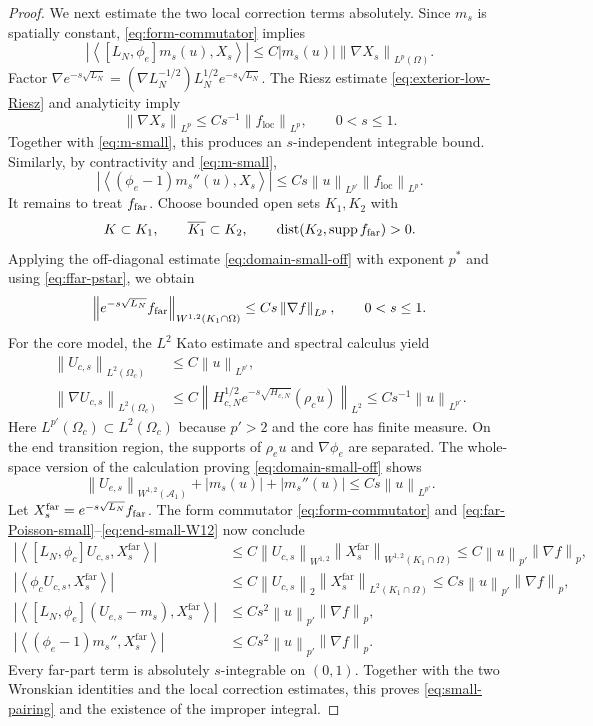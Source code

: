 \documentclass[12pt]{amsart}
\newcommand{\supp}{{\rm supp}{\hspace{.05cm}}}
\newcommand{\dist}{\operatorname{dist}}
\newcommand{\cA}{\mathcal A}
\newcommand{\ip}[2]{\left\langle #1,#2\right\rangle}
\newcommand{\norm}[2]{\left\lVert #1\right\rVert_{#2}}
\newcommand{\abs}[1]{\left\lvert #1\right\rvert}
\theoremstyle{remark}
\begin{document}
\begin{proof}
We next estimate the two local correction terms absolutely.  Since $m_s$
is spatially constant, \eqref{eq:form-commutator} implies
\[
 \abs{\ip{[L_N,\phi_e]m_s(u)}{X_s}}
 \leq C\abs{m_s(u)}\norm{\nabla X_s}{L^p(\Omega)}.
\]
Factor $\nabla e^{-s\sqrt{L_N}}=(\nabla L_N^{-1/2})L_N^{1/2}e^{-s\sqrt{L_N}}$. The Riesz estimate \eqref{eq:exterior-low-Riesz} and
analyticity imply
\[
 \norm{\nabla X_s}{L^p}
 \leq Cs^{-1}\norm{f_{\mathrm{loc}}}{L^p},\qquad 0<s\leq1.
\]
Together with \eqref{eq:m-small}, this produces an $s$-independent integrable
bound.  Similarly, by contractivity and \eqref{eq:m-small},
\[
 \abs{\ip{(\phi_e-1)m_s''(u)}{X_s}}
 \leq Cs\norm u{L^{p'}}\norm{f_{\mathrm{loc}}}{L^p}.
\]
It remains to treat $f_{\rm far}$.  Choose bounded open sets $K_1,K_2$ with
\[
 K\subset K_1,\qquad \overline{K_1}\subset K_2,\qquad
 \dist(K_2,\supp f_{\rm far})>0.
\]
Applying the off-diagonal estimate \eqref{eq:domain-small-off} with exponent
$p^*$ and using \eqref{eq:ffar-pstar}, we obtain
\begin{equation}\label{eq:far-Poisson-small}
 \norm{e^{-s\sqrt{L_N}}f_{\rm far}}{W^{1,2}(K_1\cap\Omega)}
 \leq Cs\norm{\nabla f}{L^p},\qquad0<s\leq1.
\end{equation}
For the core model, the $L^2$ Kato estimate and spectral calculus yield
\begin{align*}
 \norm{U_{c,s}}{L^2(\Omega_c)}
 &\leq C\norm u{L^{p'}},\\
 \norm{\nabla U_{c,s}}{L^2(\Omega_c)}
 &\leq C\norm{H_{c,N}^{1/2}e^{-s\sqrt{H_{c,N}}}(\rho_cu)}{L^2}
 \leq Cs^{-1}\norm u{L^{p'}}.
\end{align*}
Here $L^{p'}(\Omega_c)\subset L^2(\Omega_c)$ because $p'>2$ and the core has finite measure.  On the end transition region, the supports of
$\rho_eu$ and $\nabla\phi_e$ are separated.  The whole-space version of
the calculation proving \eqref{eq:domain-small-off} shows
\begin{equation}\label{eq:end-small-W12}
 \norm{U_{e,s}}{W^{1,2}(\cA_1)}
 +\abs{m_s(u)}+\abs{m_s''(u)}
 \leq Cs\norm u{L^{p'}}.
\end{equation}
Let $X_s^{\mathrm{far}}=e^{-s\sqrt{L_N}}f_{\rm far}$.  The form commutator
\eqref{eq:form-commutator} and
\eqref{eq:far-Poisson-small}--\eqref{eq:end-small-W12} now conclude
\begin{align*}
 \abs{\ip{[L_N,\phi_c]U_{c,s}}{X_s^{\mathrm{far}}}}
 &\leq C\norm{U_{c,s}}{W^{1,2}}
          \norm{X_s^{\mathrm{far}}}{W^{1,2}(K_1\cap\Omega)}
 \leq C\norm u{p'}\norm{\nabla f}p,\\
 \abs{\ip{\phi_cU_{c,s}}{X_s^{\mathrm{far}}}}
 &\leq C\norm{U_{c,s}}2\norm{X_s^{\mathrm{far}}}{L^2(K_1\cap\Omega)}
 \leq Cs\norm u{p'}\norm{\nabla f}p,\\
 \abs{\ip{[L_N,\phi_e](U_{e,s}-m_s)}{X_s^{\mathrm{far}}}}
 &\leq Cs^2\norm u{p'}\norm{\nabla f}p,\\
 \abs{\ip{(\phi_e-1)m_s''}{X_s^{\mathrm{far}}}}
 &\leq Cs^2\norm u{p'}\norm{\nabla f}p.
\end{align*}
Every far-part term is absolutely $s$-integrable on $(0,1)$.  Together with
the two Wronskian identities and the local correction estimates, this proves
\eqref{eq:small-pairing} and the existence of the improper integral.
\end{proof}
\end{document}
